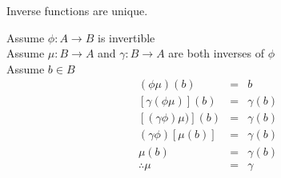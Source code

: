 \documentclass[letterpaper,12pt,fleqn]{article}
\begin{document}
\begin{theorem}
Inverse functions are unique.
\end{theorem}
\begin{theproof}
Assume $\phi:A\to B$ is invertible \\
Assume $\mu:B\to A$ and $\gamma:B\to A$ are both inverses of $\phi$ \\
Assume $b\in B$
\begin{eqnarray*}
(\phi\mu)(b) &=& b \\
\left[\gamma(\phi\mu)\right](b) &=& \gamma(b) \\
\left[(\gamma\phi)\mu)\right](b) &=& \gamma(b) \\
(\gamma\phi)[\mu(b)] &=& \gamma(b) \\
\mu(b) &=& \gamma(b) \\
\therefore \mu &=& \gamma \\
\end{eqnarray*}
\end{theproof}
\end{document}
